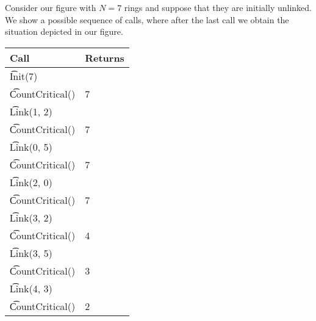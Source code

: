 Consider our figure with $N = 7$ rings and suppose that they are initially unlinked. We show a possible sequence of calls, where after the last call we obtain the situation depicted in our figure.

\begin{tabular}{|l|l|}
\hline
\bf{Call}&\bf{Returns}\\\hline
\t{Init(7)}&\\\hline
\t{CountCritical()}&7\\\hline
\t{Link(1, 2)}&\\\hline
\t{CountCritical()}&7\\\hline
\t{Link(0, 5)}&\\\hline
\t{CountCritical()}&7\\\hline
\t{Link(2, 0)}&\\\hline
\t{CountCritical()}&7\\\hline
\t{Link(3, 2)}&\\\hline
\t{CountCritical()}&4\\\hline
\t{Link(3, 5)}&\\\hline
\t{CountCritical()}&3\\\hline
\t{Link(4, 3)}&\\\hline
\t{CountCritical()}&2\\\hline
\end{tabular}